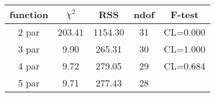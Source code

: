 \begin{tabular}{c|c|c|c|c}
function & $\chi^2$ & RSS & ndof & F-test \\
\hline
2 par & 203.41 & 1154.30 & 31 & CL=0.000 \\
3 par & 9.90 & 265.31 & 30 & CL=1.000 \\
4 par & 9.72 & 279.05 & 29 & CL=0.684 \\
5 par & 9.71 & 277.43 & 28 & \\
\hline
\end{tabular}